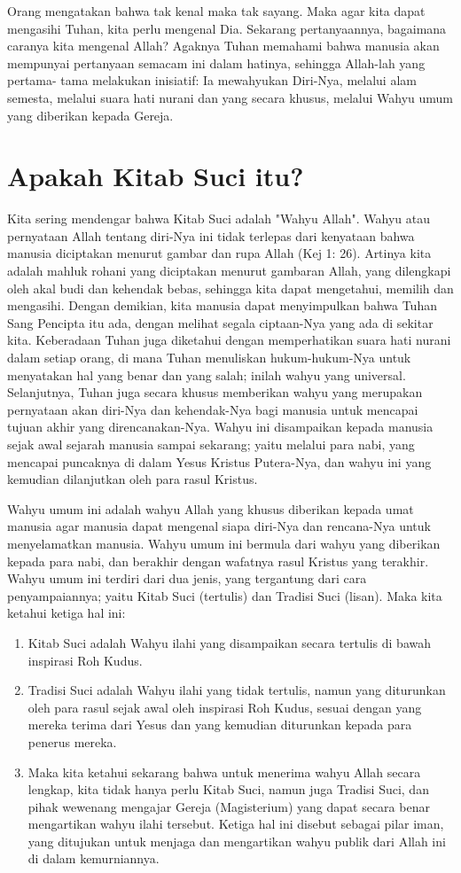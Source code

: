 Orang mengatakan bahwa tak kenal maka tak sayang. Maka agar kita dapat mengasihi Tuhan, kita perlu mengenal Dia. Sekarang pertanyaannya, bagaimana caranya kita mengenal Allah?  Agaknya Tuhan memahami bahwa manusia akan mempunyai pertanyaan semacam ini dalam hatinya, sehingga Allah-lah yang pertama- tama melakukan inisiatif: Ia mewahyukan Diri-Nya, melalui alam semesta, melalui suara hati nurani dan yang secara khusus, melalui Wahyu umum yang diberikan kepada Gereja.
\section*{Apakah Kitab Suci itu?}
Kita sering mendengar bahwa Kitab Suci adalah "Wahyu Allah". Wahyu atau pernyataan Allah tentang diri-Nya ini tidak terlepas dari kenyataan bahwa manusia diciptakan menurut gambar dan rupa Allah (Kej 1: 26). Artinya kita adalah mahluk rohani yang diciptakan menurut gambaran Allah, yang dilengkapi oleh akal budi dan kehendak bebas, sehingga kita dapat mengetahui, memilih dan mengasihi. Dengan demikian, kita manusia dapat menyimpulkan bahwa Tuhan Sang Pencipta itu ada, dengan melihat segala ciptaan-Nya yang ada di sekitar kita. Keberadaan Tuhan juga diketahui dengan memperhatikan suara hati nurani dalam setiap orang, di mana Tuhan menuliskan hukum-hukum-Nya untuk menyatakan hal yang benar dan yang salah; inilah wahyu yang universal. Selanjutnya, Tuhan juga secara khusus memberikan wahyu yang merupakan pernyataan akan diri-Nya dan kehendak-Nya bagi manusia untuk mencapai tujuan akhir yang direncanakan-Nya. Wahyu ini disampaikan kepada manusia sejak awal sejarah manusia sampai sekarang; yaitu  melalui para nabi, yang mencapai puncaknya di dalam Yesus Kristus Putera-Nya, dan wahyu ini yang kemudian dilanjutkan oleh para rasul Kristus.

Wahyu umum ini adalah wahyu Allah yang khusus diberikan kepada umat manusia agar manusia dapat mengenal siapa diri-Nya dan rencana-Nya untuk menyelamatkan manusia. Wahyu umum ini bermula dari wahyu yang diberikan kepada para nabi, dan berakhir dengan wafatnya rasul Kristus yang terakhir. Wahyu umum ini terdiri dari dua jenis, yang tergantung dari cara penyampaiannya; yaitu Kitab Suci (tertulis) dan Tradisi Suci (lisan). Maka kita ketahui ketiga hal ini:
\begin{enumerate}
\item Kitab Suci adalah Wahyu ilahi yang disampaikan secara tertulis di bawah inspirasi Roh Kudus.
\item Tradisi Suci adalah Wahyu ilahi yang tidak tertulis, namun yang diturunkan oleh para rasul sejak awal oleh inspirasi Roh Kudus, sesuai dengan yang mereka terima dari Yesus dan yang kemudian diturunkan kepada para penerus mereka.
\item Maka kita ketahui sekarang bahwa untuk menerima wahyu Allah secara lengkap, kita tidak hanya perlu Kitab Suci, namun juga Tradisi Suci, dan pihak wewenang mengajar Gereja (Magisterium) yang dapat secara benar mengartikan wahyu ilahi tersebut. Ketiga hal ini disebut sebagai pilar iman, yang ditujukan untuk menjaga dan mengartikan wahyu publik dari Allah ini di dalam kemurniannya.
\end{enumerate}

